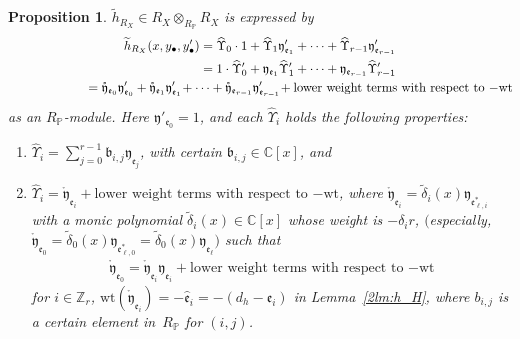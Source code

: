 \documentclass[10pt,a4paper]{amsart}
\def\CC{{\mathbb C}}
\def\ZZ{{\mathbb Z}}
\def\PP{{\mathbb P}}
\def\fb{{\mathfrak b}}
\def\fe{{\mathfrak e}}
\def\fy{{\mathfrak y}}
\def\th{{\widetilde h}}
\def\tdelta{{\widetilde \delta}}
\def\hfe{{\widehat{\mathfrak e}}}
\def\hUpsilon{{\widehat \Upsilon}}
\def\rfy{{\mathring{\mathfrak y}}}
\def\wt{{\mathrm {wt}}}
\numberwithin{equation}{section}
\newtheorem{Proposition}[Theorem]{Proposition}
 { \theoremstyle{definition}
\newtheorem{Definition}[Theorem]{Definition}
\newtheorem{Note}[Theorem]{Note}
\newtheorem{Example}[Theorem]{Example}
\newtheorem{Remark}[Theorem]{Remark} }
\begin{document}
\begin{Proposition}\label{2pr:h_RXe_ys}$\th_{R_X}\in R_X\otimes_{R_\PP} R_X$ is expressed by
\begin{gather*}
\th_{R_X}(x, y_{\bullet}, y_{\bullet}')= \hUpsilon_{0}\cdot 1
+ \hUpsilon_{1}\fy'_{\fe_1}+\cdots+ \hUpsilon_{r-1}\fy'_{\fe_{r-1}}\\
\hphantom{\th_{R_X}(x, y_{\bullet}, y_{\bullet}')}{}
= 1\cdot\hUpsilon_{0}'
+ \fy_{\fe_1}\hUpsilon_{1}'+\cdots+ \fy_{\fe_{r-1}}\hUpsilon_{r-1}'\\
\hphantom{\th_{R_X}(x, y_{\bullet}, y_{\bullet}')}{}
= \rfy_{\fe_0}\fy'_{\fe_0}
+ \rfy_{\fe_1}\fy'_{\fe_1}\!+\cdots+ \rfy_{\fe_{r-1}}\fy'_{\fe_{r-1}} \!
 +\text{lower weight terms with respect to $-\wt$}\!
\end{gather*}
as an $R_\PP$-module.
Here $\fy'_{\fe_0}=1$, and each $\hUpsilon_{i}$ holds the following properties:
\begin{enumerate}\itemsep=0pt
\item[$(1)$]
$\hUpsilon_{i}=\sum_{j=0}^{r-1} \fb_{i,j} \fy_{\fe_j}$, with certain $\fb_{i,j}\in \CC[x]$, and

\item[$(2)$]
$\hUpsilon_{i}= \rfy_{\fe_i}+
\text{lower weight terms with respect to $-\wt$}$,
where
$\rfy_{\fe_i}
=\tdelta_i(x) \fy_{\fe_{\ell,i}^*}$
with a monic polynomial $\tdelta_i(x) \in \CC[x]$ whose weight is
$-\delta_i r$, $($especially, $\rfy_{\fe_0}
=\tdelta_0(x) \fy_{\fe_{\ell,0}^*}=\tdelta_0(x) \fy_{\fe_{\ell}})$
such that
\begin{gather*}
\rfy_{\fe_0}=\rfy_{\fe_i}\fy_{\fe_i}+
\text{lower weight terms with respect to $-\wt$}
\end{gather*} for
$i \in \ZZ_r$, $\wt(\rfy_{\fe_i})=-\hfe_i=-(d_h - \fe_i)$ in
Lemma~{\rm \ref{2lm:h_H}}, where $b_{i, j}$ is a certain element in~$R_\PP$ for $(i,j)$.
\end{enumerate}
\end{Proposition}
\end{document}
